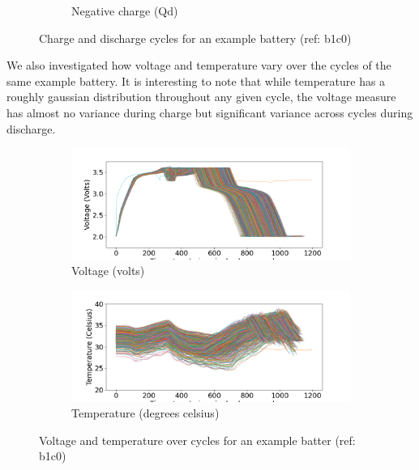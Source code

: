 \begin{itemize}
\begin{figure}[H]
\begin{subfigure}[b]{0.32\linewidth}
                \caption{Negative charge (Qd)}
            \end{subfigure}
            \caption{Charge and discharge cycles for an example battery (ref: b1c0)}
            \label{fig:1c}
        \end{figure}

    We also investigated how voltage and temperature vary over the cycles of the same example battery. It is interesting to note that while temperature has a roughly gaussian distribution throughout any given cycle, the voltage measure has almost no variance during charge but significant variance across cycles during discharge. 
    
        \begin{figure}[H]
            \centering
            \begin{subfigure}[b]{0.49\linewidth}
                \includegraphics[width=\linewidth]{figs/b1c0_voltage_intracycle.png}
                \caption{Voltage (volts)}
            \end{subfigure}
            \begin{subfigure}[b]{0.49\linewidth}
                \includegraphics[width=\linewidth]{figs/b1c0_temp_intracycle.png}
                \caption{Temperature (degrees celsius)}
            \end{subfigure}
            \caption{Voltage and temperature over cycles for an example batter (ref: b1c0)}
            \label{fig:1d}
        \end{figure}
        

\end{itemize}
